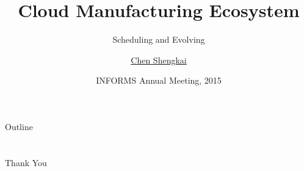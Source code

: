\documentclass[x11names]{beamer}
\title{Cloud Manufacturing Ecosystem}
\subtitle{Scheduling and Evolving}
\author{\href{mailto:42@zju.edu.cn}{Chen Shengkai }} %
\institute[Zhejiang University] %
{
  Institute for Manufacturing Engineering and Automation\\
  Zhejiang University%
}
\date{INFORMS Annual Meeting, 2015}
\begin{document}
\begin{frame}
  \titlepage
\end{frame}

\begin{frame}{Outline}
  \begin{multicols}{2}
  \tableofcontents
  \end{multicols}
\end{frame}


\section*{}
\begin{frame}
\centering
\Large
Thank You
\end{frame}
%

\end{document}
